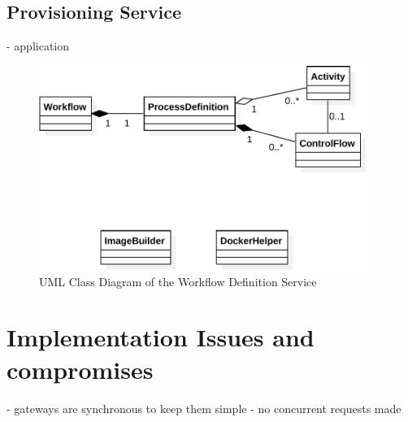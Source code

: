   \subsection{Provisioning Service} %
    \label{sub:provisioning_service}
      - application


\begin{figure}[htbp]
  \centering
  \includegraphics[width=0.95\textwidth]{content/images/class_d_definition-crop.pdf}
  \caption{UML Class Diagram of the Workflow Definition Service}
  \label{fig:uml_class_diagram_definition_service}
\end{figure}

\section{Implementation Issues and compromises} %
  - gateways are synchronous to keep them simple
    - no concurrent requests made
\label{sec:implementation_issues}

